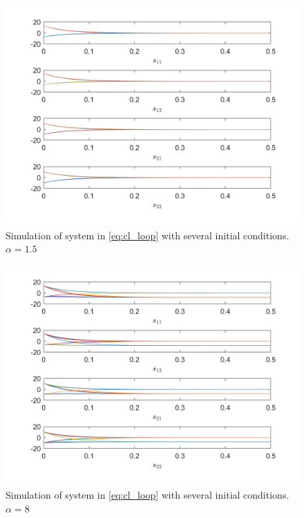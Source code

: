 \begin{figure}
    \centering
    \includegraphics[width=\textwidth]{text/analysis/fig/2by2monotone/s.png}
    \caption{Simulation of system in \eqref{eq:cl_loop} with several initial conditions. $\alpha=1.5$}
    \label{fig:s_mono_one}
\end{figure}
    
\begin{figure}
    \centering
    \includegraphics[width=\textwidth]{text/analysis/fig/2by2monotone/s_2.png}
    \caption{Simulation of system in \eqref{eq:cl_loop} with several initial conditions. $\alpha=8$}
    \label{fig:s_mono_two}
\end{figure}
        
